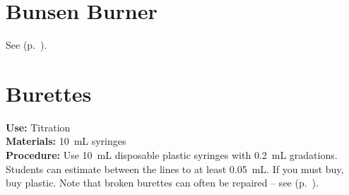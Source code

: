 \begin{multicols}{2}

\section{Bunsen Burner}
\label{sec:bunsen-burner}
See  (p.~\pageref{sec:heatsources}).

\section{Burettes}
\label{sec:burettes}
\vspace{-10pt}
\textbf{Use:} Titration\\
\textbf{Materials:} 10~mL syringes \\
\textbf{Procedure:} Use 10~mL disposable plastic syringes with 0.2~mL gradations. Students can estimate between the lines to at least 0.05~mL. If you must buy, buy plastic. Note that broken burettes can often be repaired -- see  (p.~\pageref{cha:burettes}).




\end{multicols}
